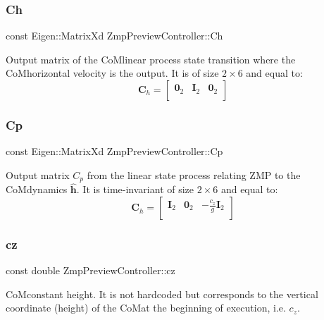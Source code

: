 \subsubsection{\texorpdfstring{Ch}{Ch}}
{\footnotesize\ttfamily const Eigen\+::\+Matrix\+Xd Zmp\+Preview\+Controller\+::\+Ch\hspace{0.3cm}{\ttfamily [private]}}

Output matrix of the Co\+Mlinear process state transition where the Co\+Mhorizontal velocity is the output. It is of size $2\times6$ and equal to\+: \[ \mathbf{C}_h = \left[\begin{array}{ccc} \mathbf{0}_2 & \mathbf{I}_2 & \mathbf{0}_2 \\ \end{array}\right] \] \hypertarget{classZmpPreviewController_a1a63870dcc3d51a26c4adc9c97e650ff}{}\label{classZmpPreviewController_a1a63870dcc3d51a26c4adc9c97e650ff} 
\subsubsection{\texorpdfstring{Cp}{Cp}}
{\footnotesize\ttfamily const Eigen\+::\+Matrix\+Xd Zmp\+Preview\+Controller\+::\+Cp\hspace{0.3cm}{\ttfamily [private]}}

Output matrix $C_p$ from the linear state process relating Z\+MP to the Co\+Mdynamics $\hat{\mathbf{h}}$. It is time-\/invariant of size $2\times6$ and equal to\+: \[ \mathbf{C}_h = \left[\begin{array}{ccc} \mathbf{I}_2 & \mathbf{0}_2 & -\frac{c_z}{g}\mathbf{I}_2 \\ \end{array}\right] \] \hypertarget{classZmpPreviewController_a3a317d26cc1bbaf8811491724fdd1def}{}\label{classZmpPreviewController_a3a317d26cc1bbaf8811491724fdd1def} 
\subsubsection{\texorpdfstring{cz}{cz}}
{\footnotesize\ttfamily const double Zmp\+Preview\+Controller\+::cz\hspace{0.3cm}{\ttfamily [private]}}

Co\+Mconstant height. It is not hardcoded but corresponds to the vertical coordinate (height) of the Co\+Mat the beginning of execution, i.\+e. $ c_z $. \hypertarget{classZmpPreviewController_abf1a3ec8d1698afab1c20bba32b5a724}{}\label{classZmpPreviewController_abf1a3ec8d1698afab1c20bba32b5a724} 
